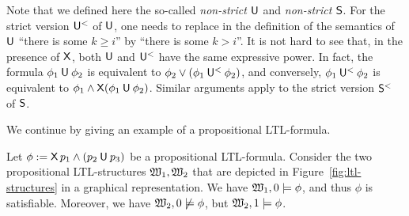 \noindent
Note that we defined here the so-called \emph{non-strict $\mathbin{\mathsf{U}}$} and
\emph{non-strict $\mathbin{\mathsf{S}}$}.  For the strict version $\mathbin{\mathsf{U}^<}$ of $\mathbin{\mathsf{U}}$, one
needs to replace in the definition of the semantics of $\mathbin{\mathsf{U}}$ \enquote{there
is some $k\ge i$} by \enquote{there is some $k>i$}.  It is not hard to see that,
in the presence of $\operatorname{\mathsf{X}}$, both $\mathbin{\mathsf{U}}$ and $\mathbin{\mathsf{U}^<}$ have the same expressive
power.  In fact, the formula $\phi_1\mathbin{\mathsf{U}}\phi_2$ is equivalent to
$\phi_2\lor(\phi_1\mathbin{\mathsf{U}^<}\phi_2)$, and conversely, $\phi_1\mathbin{\mathsf{U}^<}\phi_2$ is
equivalent to $\phi_1\land\operatorname{\mathsf{X}}(\phi_1\mathbin{\mathsf{U}}\phi_2)$.  Similar arguments apply
to the strict version $\mathbin{\mathsf{S}^<}$ of $\mathbin{\mathsf{S}}$.

We continue by giving an example of a propositional LTL-formula.

\begin{example}\label{ex:ltl}
    Let $\phi:=\operatorname{\mathsf{X}} p_1\land(p_2\mathbin{\mathsf{U}} p_3)$ be a propositional LTL-formula.
    Consider the two propositional LTL-structures $\mathfrak{W}_1,\mathfrak{W}_2$ that are
    depicted in Figure~\ref{fig:ltl-structures} in a graphical representation.
    We have $\mathfrak{W}_1,0\models\phi$, and thus $\phi$ is satisfiable.  Moreover, we
    have $\mathfrak{W}_2,0\not\models\phi$, but $\mathfrak{W}_2,1\models\phi$.
\end{example}

